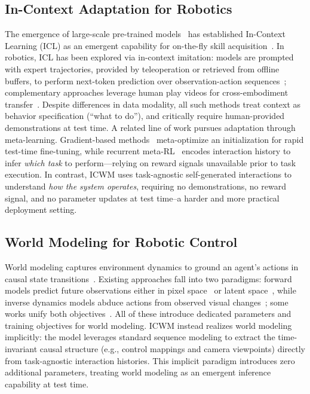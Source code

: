 

\subsection{In-Context Adaptation for Robotics}
The emergence of large-scale pre-trained models~\cite{Radford2019LanguageMA,Touvron2023LLaMAOA,OpenAI2022ChatGPT} has established In-Context Learning (ICL) as an emergent capability for on-the-fly skill acquisition~\cite{Brown2020LanguageMA,Dong2022ASO}. In robotics, ICL has been explored via in-context imitation: models are prompted with expert trajectories, provided by teleoperation or retrieved from offline buffers, to perform next-token prediction over observation-action sequences~\cite{Fu2024ICRTII,An2025ActionTM,Sridhar2025RICLAI}; complementary approaches leverage human play videos for cross-embodiment transfer~\cite{Shah2025MimicDroidIL,Jain2024Vid2RobotEV}. Despite differences in data modality, all such methods treat context as behavior specification (``what to do''), and critically require human-provided demonstrations at test time. 
A related line of work pursues adaptation through meta-learning. Gradient-based methods~\cite{MAML2017,Liu2019MetaLearningWI} meta-optimize an initialization for rapid test-time fine-tuning, while recurrent meta-RL~\cite{Duan2016RL2FR, Zintgraf2020VariBADAV} encodes interaction history 
to infer \textit{which task} to perform—relying on reward signals unavailable prior to task execution. 
In contrast, ICWM uses task-agnostic self-generated interactions to understand \textit{how the system operates}, requiring no demonstrations, no reward signal, and no parameter updates at test time--a harder and more practical deployment setting.




\subsection{World Modeling for Robotic Control}
World modeling captures environment dynamics to ground an agent's actions in causal state transitions~\cite{Ha2018RecurrentWM,LeCun2022APT, Ding2024UnderstandingWO,wang2025world,wang2026world}. Existing approaches fall into two paradigms: forward models predict future observations either in pixel space~\cite{GR-1, Li2024GRMGLP,Zhao2025CoTVLAVC,Cen2025WorldVLATA} or latent space~\cite{Hafner2019DreamTC,Hafner2020MasteringAW,Wu2022DayDreamerWM, Hafner2023MasteringDD,Zheng2025FLARERL}, while inverse dynamics models abduce actions from observed visual changes~\cite{Du2023LearningUP,Jang2025DreamGenUG,Tian2024PredictiveID,Baker2022VideoP}; some works unify both objectives~\cite{Zhu2025UnifiedWM,Li2025UnifiedVA}. All of these introduce dedicated parameters and training objectives for world modeling. ICWM instead realizes world modeling implicitly: 
the model leverages standard sequence modeling to extract the time-invariant causal structure (e.g., control mappings and camera viewpoints) directly from task-agnostic interaction histories. 
This implicit paradigm introduces zero additional parameters, treating world modeling as an emergent inference capability at test time.

